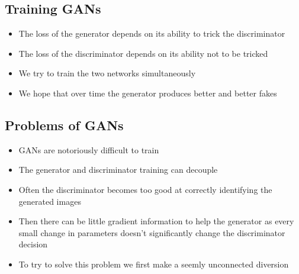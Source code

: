 \begin{slide}
\section{Training GANs}

\begin{PauseHighLight}
  \begin{itemize}
  \item The loss of the generator depends on its ability to trick the
    discriminator\pause
  \item The loss of the discriminator depends on its ability not to be
    tricked\pause
  \item We try to train the two networks simultaneously\pause
  \item We hope that over time the generator produces better and
    better fakes\pause
  \end{itemize}
\end{PauseHighLight}

\end{slide}

\begin{slide}
\section{Problems of GANs}

\begin{PauseHighLight}
  \begin{itemize}
  \item GANs are notoriously difficult to train\pause
  \item The generator and discriminator training can decouple\pause
  \item Often the discriminator becomes too good at correctly
    identifying the generated images\pause
  \item Then there can be little gradient information to help the
    generator as every small change in parameters doesn't significantly
    change the discriminator decision\pause
  \item To try to solve this problem we first make a seemly
    unconnected diversion\pause
  \end{itemize}
\end{PauseHighLight}
\end{slide}

\Outline %

